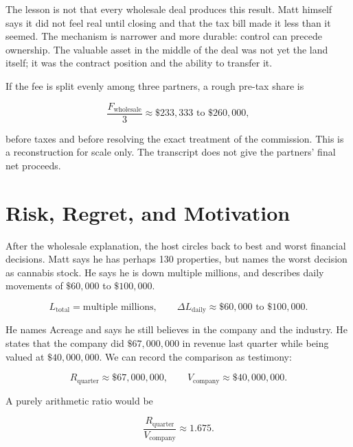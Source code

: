 The lesson is not that every wholesale deal produces this result. Matt himself says it did not feel real until closing and that the tax bill made it less than it seemed. The mechanism is narrower and more durable: control can precede ownership. The valuable asset in the middle of the deal was not yet the land itself; it was the contract position and the ability to transfer it.

If the fee is split evenly among three partners, a rough pre-tax share is

\begin{equation}
\frac{F_{\text{wholesale}}}{3}
\approx
\$233{,}333 \text{ to } \$260{,}000,
\end{equation}

before taxes and before resolving the exact treatment of the commission. This is a reconstruction for scale only. The transcript does not give the partners' final net proceeds.

\section{Risk, Regret, and Motivation}

After the wholesale explanation, the host circles back to best and worst financial decisions. Matt says he has perhaps 130 properties, but names the worst decision as cannabis stock. He says he is down multiple millions, and describes daily movements of \(\$60{,}000\) to \(\$100{,}000\).

\begin{equation}
L_{\text{total}}=\text{multiple millions},
\qquad
\Delta L_{\text{daily}}\approx \$60{,}000\text{ to }\$100{,}000.
\end{equation}

He names Acreage and says he still believes in the company and the industry. He states that the company did \(\$67{,}000{,}000\) in revenue last quarter while being valued at \(\$40{,}000{,}000\). We can record the comparison as testimony:

\begin{equation}
R_{\text{quarter}}\approx \$67{,}000{,}000,
\qquad
V_{\text{company}}\approx \$40{,}000{,}000.
\end{equation}

A purely arithmetic ratio would be

\begin{equation}
\frac{R_{\text{quarter}}}{V_{\text{company}}}
\approx
1.675.
\end{equation}

